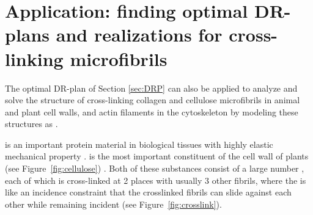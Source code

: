 \section{Application: finding optimal DR-plans and realizations for cross-linking microfibrils }
\label{sec:pinnedline}

The optimal DR-plan of Section \ref{sec:DRP} can also be applied to analyze and solve
the structure of  cross-linking collagen and cellulose microfibrils 
in animal and plant cell walls, and actin filaments in the cytoskeleton
by modeling these structures as .


 is an important protein material in biological tissues with highly elastic mechanical property \cite{buehler2008nanomechanics}.
 is the most important constituent of the cell wall of plants (see Figure~\ref{fig:cellulose}) \cite{fall2013physical,smith1971plant}.
Both of these substances consist of a large number ,
each of which is cross-linked at 2 places with usually 3 other fibrils,
where the  is like an incidence constraint that the
crosslinked fibrils can slide against each other while remaining incident (see
Figure~\ref{fig:crosslink}).

%
%
%
%
%
%


